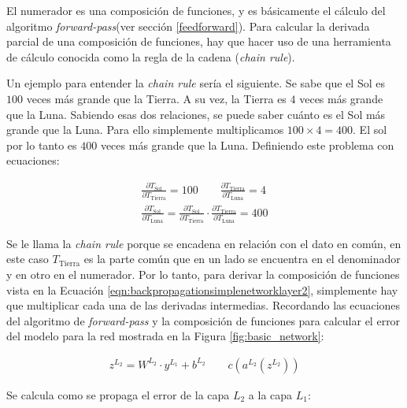 El numerador es una composición de funciones, y es básicamente el cálculo del algoritmo \textit{forward-pass}(ver sección \ref{feedforward}). Para calcular la derivada parcial de una composición de funciones, hay que hacer uso de una herramienta de cálculo conocida como la regla de la cadena (\textit{chain rule}).
\newline

Un ejemplo para entender la \textit{chain rule} sería el siguiente. Se sabe que el Sol es $100$ veces más grande que la Tierra. A su vez, la Tierra es $4$ veces más grande que la Luna. Sabiendo esas dos relaciones, se puede saber cuánto es el Sol más grande que la Luna. Para ello simplemente multiplicamos $100 \times 4 = 400$. El sol por lo tanto es $400$ veces más grande que la Luna. Definiendo este problema con ecuaciones:

\begin{equation}
\begin{split}
    \frac{\partial T_{\text{Sol}}}{\partial T_{\text{Tierra}}} = 100
    \qquad
    \frac{\partial T_{\text{Tierra}}}{\partial T_{\text{Luna}}} = 4 \\
    \frac{\partial T_{\text{Sol}}}{\partial T_{\text{Luna}}} = \frac{\partial T_{\text{Sol}}}{\partial T_{\text{Tierra}}} \cdot \frac{\partial T_{\text{Tierra}}}{\partial T_{\text{Luna}}} = 400 \nonumber
\end{split}
\end{equation}

Se le llama la \textit{chain rule} porque se encadena en relación con el dato en común, en este caso $T_\text{Tierra}$ es la parte común que en un lado se encuentra en el denominador y en otro en el numerador. Por lo tanto, para derivar la composición de funciones vista en la Ecuación \ref{eqn:backpropagationsimplenetworklayer2}, simplemente hay que multiplicar cada una de las derivadas intermedias. Recordando las ecuaciones del algoritmo de \textit{forward-pass} y la composición de funciones para calcular el error del modelo para la red mostrada en la Figura \ref{fig:basic_network}:

\begin{equation}
\begin{split}
    z^{L_2} = W^{L_2} \cdot y^{L_1} + b^{L_2}
    \qquad
    c(a^{L_2}(z^{L_2}))
\end{split}
\end{equation}

Se calcula como se propaga el error de la capa $L_2$ a la capa $L_1$:

